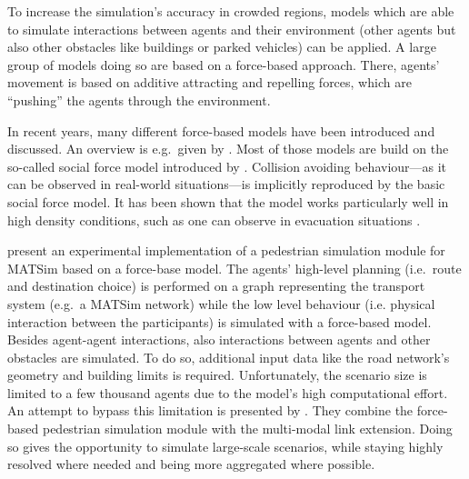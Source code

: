 To increase the simulation's accuracy in crowded regions, models which are able to simulate interactions between agents and their environment (other agents but also other obstacles like buildings or parked vehicles) can be applied. A large group of models doing so are based on a force-based approach. There, agents' movement is based on additive attracting and repelling forces, which are ``pushing'' the agents through the environment.

In recent years, many different force-based models have been introduced and discussed. An overview is e.g.~given by \citet{OlesonEtAl_BazzanKluegl_2009}. Most of those models are build on the so-called social force model introduced by \citet{HelbingMolnar_PhysRevE_1995}. Collision avoiding behaviour---as it can be observed in real-world situations---is implicitly reproduced by the basic social force model. It has been shown that the model works particularly well in high density conditions, such as one can observe in evacuation situations \citep{HelbingEtAl_Nature_2000}.

\citet{LaemmelPlaue_PED_2012} present an experimental implementation of a pedestrian simulation module for MATSim based on a force-base model. The agents' high-level planning (i.e.\ route and destination choice) is performed on a graph representing the transport system (e.g.~a MATSim network) while the low level behaviour (i.e. physical interaction between the participants) is simulated with a force-based model. Besides agent-agent interactions, also interactions between agents and other obstacles are simulated. To do so, additional input data like the road network's geometry and building limits is required. Unfortunately, the scenario size is limited to a few thousand agents due to the model's high computational effort. An attempt to bypass this limitation is presented by \citet{DoblerLaemmel_PED_2012}. They combine the force-based pedestrian simulation module with the multi-modal link extension. Doing so gives the opportunity to simulate large-scale scenarios, while staying highly resolved where needed and being more aggregated where possible.

